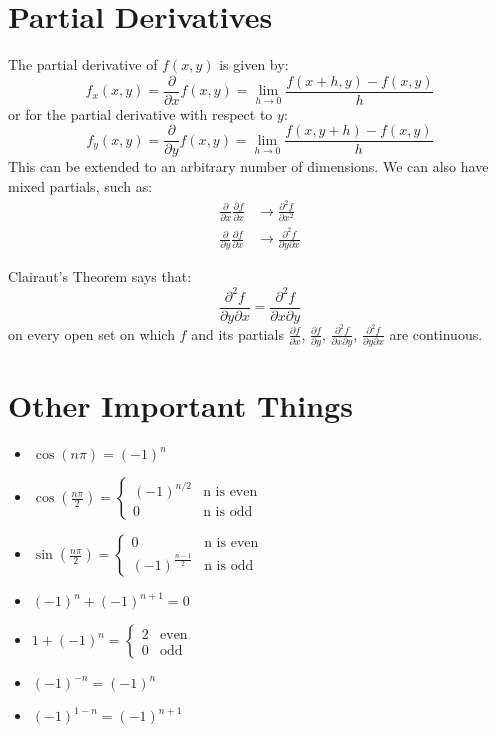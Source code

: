 \documentclass{article}
\begin{document}
    \section{Partial Derivatives}
    The partial derivative of $f(x,y)$ is given by:
    \begin{equation}
        f_x(x,y) = \frac{\partial}{\partial x} f(x,y) = \lim_{h\to 0} \frac{f(x+h,y)-f(x,y)}{h}
    \end{equation}
    or for the partial derivative with respect to $y$:
    \begin{equation}
        f_y(x,y) = \frac{\partial}{\partial y}f(x,y) = \lim_{h\to 0} \frac{f(x,y+h)-f(x,y)}{h}
    \end{equation}
    This can be extended to an arbitrary number of dimensions. We can also have mixed partials, such as:
    \begin{align}
        \frac{\partial}{\partial x} \frac{\partial f}{\partial x} &\to \frac{\partial^2 f}{\partial x^2} \\ 
        \frac{\partial}{\partial y} \frac{\partial f}{\partial x} &\to \frac{\partial^2 f}{\partial y\partial x}
    \end{align}
    \begin{theorem}
        Clairaut's Theorem says that:
        \begin{equation}
            \frac{\partial^2 f}{\partial y\partial x} = \frac{\partial^2 f}{\partial x\partial y}
        \end{equation}
        on every open set on which $f$ and its partials $\frac{\partial f}{\partial x}$, $\frac{\partial f}{\partial y}$, $\frac{\partial^2 f}{\partial x\partial y}$, $\frac{\partial^2 f}{\partial y\partial x}$ are continuous.
    \end{theorem}
    \section{Other Important Things}
    \begin{itemize}
        \item $\cos(n\pi)=(-1)^n$
        \item $\cos\left(\frac{n\pi}{2}\right) = \begin{cases}
            (-1)^{n/2} & \text{n is even} \\ 
            0 & \text{n is odd}
        \end{cases}$
        \item $\sin\left(\frac{n\pi}{2}\right)=\begin{cases}
            0 & \text{n is even} \\ 
            (-1)^{\frac{n-1}{2}} & \text{n is odd}
        \end{cases}$
        \item $(-1)^n + (-1)^{n+1} = 0$
        \item $1+(-1)^n = \begin{cases}
            2 & \text{even} \\ 
            0 & \text{odd}
        \end{cases}$
        \item $(-1)^{-n} = (-1)^n$
        \item $(-1)^{1-n} = (-1)^{n+1}$
    \end{itemize}
\end{document}
